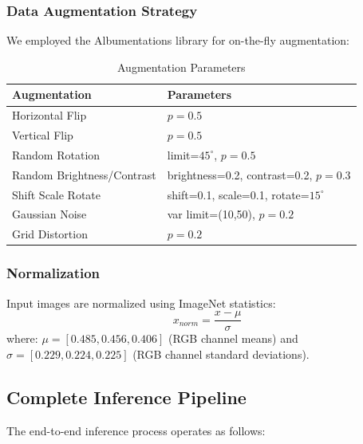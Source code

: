 \documentclass[runningheads]{llncs}
\begin{document}
\subsubsection{Data Augmentation Strategy}
We employed the Albumentations library for on-the-fly augmentation:

\begin{table}[H]
\caption{Augmentation Parameters}
\label{tab:aug_config}
\centering
\begin{tabular}{ll}
\toprule
\textbf{Augmentation} & \textbf{Parameters} \\
\midrule
Horizontal Flip & $p=0.5$ \\
Vertical Flip & $p=0.5$ \\
Random Rotation & limit=$45^{\circ}$, $p=0.5$ \\
Random Brightness/Contrast & brightness=0.2, contrast=0.2, $p=0.3$ \\
Shift Scale Rotate & shift=0.1, scale=0.1, rotate=$15^{\circ}$ \\
Gaussian Noise & var limit=(10,50), $p=0.2$ \\
Grid Distortion & $p=0.2$ \\
\bottomrule
\end{tabular}
\end{table}

\subsubsection{Normalization}
Input images are normalized using ImageNet statistics:
\begin{equation}
x_{norm}=\frac{x-\mu}{\sigma}
\end{equation}
where: $\mu=[0.485,0.456,0.406]$ (RGB channel means) and $\sigma=[0.229,0.224,0.225]$ (RGB channel standard deviations).

\subsection{Complete Inference Pipeline}
The end-to-end inference process operates as follows:
\end{document}
